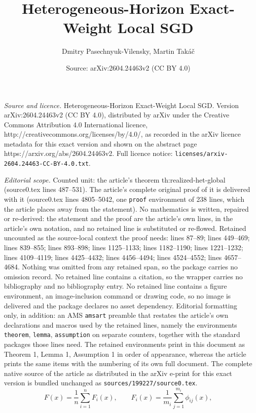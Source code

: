 \documentclass[10pt,a4paper]{amsart}
\title{Heterogeneous-Horizon Exact-Weight Local SGD}
\author{Dmitry Pasechnyuk-Vilensky, Martin Tak\'a\v{c}}
\date{Source: arXiv:2604.24463v2 (CC BY 4.0)}
\begin{document}
\maketitle

\noindent\emph{Source and licence.} Heterogeneous-Horizon Exact-Weight Local SGD. Version arXiv:2604.24463v2 (CC BY 4.0), distributed by arXiv under the Creative Commons Attribution 4.0 International licence, http://creativecommons.org/licenses/by/4.0/, as recorded in the arXiv licence metadata for this exact version and shown on the abstract page https://arxiv.org/abs/2604.24463v2. Full licence notice: \texttt{licenses/arxiv-2604.24463-CC-BY-4.0.txt}.\par\smallskip

\noindent\textit{Editorial scope.} Counted unit: the article's theorem th:realized-het-global (source0.tex lines 487--531). The article's complete original proof of it is delivered with it (source0.tex lines 4805--5042, one \texttt{proof} environment of 238 lines, which the article places away from the statement). No mathematics is written, repaired or re-derived: the statement and the proof are the article's own lines, in the article's own notation, and no retained line is substituted or re-flowed.  Retained uncounted as the source-local context the proof needs: lines 87--89; lines 449--469; lines 839--855; lines 893--898; lines 1125--1133; lines 1182--1190; lines 1221--1232; lines 4109--4119; lines 4425--4432; lines 4456--4494; lines 4524--4552; lines 4657--4684.  Nothing was omitted from any retained span, so the package carries no omission record.  No retained line contains a citation, so the wrapper carries no bibliography and no bibliography entry.  No retained line contains a figure environment, an image-inclusion command or drawing code, so no image is delivered and the package declares no asset dependency.  Editorial formatting only, in addition: an AMS \texttt{amsart} preamble that restates the article's own declarations and macros used by the retained lines, namely the environments \texttt{theorem}, \texttt{lemma}, \texttt{assumption} on separate counters, together with the standard packages those lines need.  The retained environments print in this document as Theorem 1, Lemma 1, Assumption 1 in order of appearance, whereas the article prints the same items with the numbering of its own full document.  The complete native source of the article as distributed in the arXiv e-print for this exact version is bundled unchanged as \texttt{sources/199227/source0.tex}.
\begin{equation}
F(x)=\frac1n\sum_{i=1}^n F_i(x),\qquad F_i(x)=\frac1{m_i}\sum_{j=1}^{m_i}\phi_{ij}(x),
\label{eq:model}\end{equation}
\end{document}
